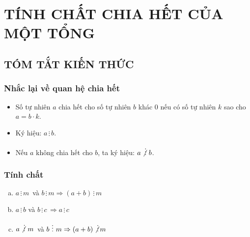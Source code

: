 \section{TÍNH CHẤT CHIA HẾT CỦA MỘT TỔNG}
\subsection{TÓM TẮT KIẾN THỨC}
\begin{tomtat}
\subsubsection{Nhắc lại về quan hệ chia hết}
\begin{itemize}
\item Số tự nhiên $a$ chia hết cho số tự nhiên $b$ khác $0$ nếu có số tự nhiên $k$ sao cho $a = b \cdot k$.
\item Ký hiệu: $a \,\vdots \,b$.
\item Nếu $a$ không chia hết cho $b$, ta ký hiệu: $a\not\vdots \,\,b$.
\end{itemize}
\subsubsection{Tính chất}
\begin{enumerate}[a)]
\item  
$a\, \vdots \,m\,$ và $b\, \vdots \,m \Rightarrow \left( {a + b} \right)\, \vdots \,m$

\item 
$a\, \vdots \,b$ và $b\, \vdots \,c\, \Rightarrow a\, \vdots \,c$

\item 
$a\not\vdots \,\,m\,$ và $b\,\,\vdots \,\,m \Rightarrow \left( {a + b} \right) \not\vdots \,m$
\end{enumerate}
\end{tomtat}
